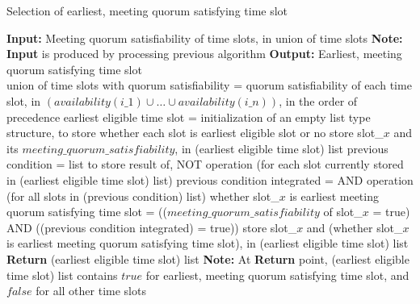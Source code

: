 \begin{algorithm}[H]
    \caption{Selection of earliest, meeting quorum satisfying time slot}
    \begin{algorithmic}[1]
        \State \textbf{Input:} Meeting quorum satisfiability of time slots, in union of time slots
        \State \textbf{Note:} \textbf{Input} is produced by processing previous algorithm
        \State \textbf{Output:} Earliest, meeting quorum satisfying time slot \\
        \State union of time slots with quorum satisfiability = quorum satisfiability of each time slot, in \((availability(i\_1) \cup \dots \cup availability(i\_n))\), in the order of precedence
        \State earliest eligible time slot = initialization of an empty list type structure, to store whether each slot is earliest eligible slot or no
                \State store slot\_\(x\) and its \(meeting\_quorum\_satisfiability\), in (earliest eligible time slot) list     
            \Else
                \State previous condition = list to store result of, NOT operation (for each slot currently stored in (earliest eligible time slot) list)
                \State previous condition integrated = AND operation (for all slots in (previous condition) list) 
                \State whether slot\_\(x\) is earliest meeting quorum satisfying time slot = ((\(meeting\_quorum\_satisfiability\) of slot\_\(x\) = true) AND ((previous condition integrated) = true))
                \State store slot\_\(x\) and (whether slot\_\(x\) is earliest meeting quorum satisfying time slot), in (earliest eligible time slot) list                
            \EndIf
        \EndFor
        \State \textbf{Return} (earliest eligible time slot) list 
        \State \textbf{Note:} At \textbf{Return} point, (earliest eligible time slot) list contains \(true\) for earliest, meeting quorum satisfying time slot, and \(false\) for all other time slots
    \end{algorithmic}
\end{algorithm}

